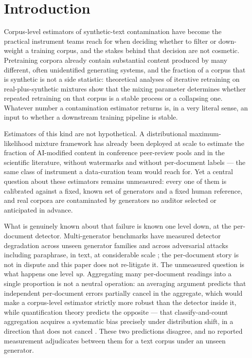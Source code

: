 \documentclass[11pt]{article}
\begin{document}
\section{Introduction}

Corpus-level estimators of synthetic-text contamination have become the practical instrument teams reach for when deciding whether to filter or down-weight a training corpus, and the stakes behind that decision are not cosmetic. Pretraining corpora already contain substantial content produced by many different, often unidentified generating systems, and the fraction of a corpus that is synthetic is not a side statistic: theoretical analyses of iterative retraining on real-plus-synthetic mixtures show that the mixing parameter determines whether repeated retraining on that corpus is a stable process or a collapsing one. Whatever number a contamination estimator returns is, in a very literal sense, an input to whether a downstream training pipeline is stable.

Estimators of this kind are not hypothetical. A distributional maximum-likelihood mixture framework has already been deployed at scale to estimate the fraction of AI-modified content in conference peer-review pools and in the scientific literature, without watermarks and without per-document labels \citep{MonitoringAIContent2024,MappingLLMUse2024} --- the same class of instrument a data-curation team would reach for. Yet a central question about these estimators remains unmeasured: every one of them is calibrated against a fixed, known set of generators and a fixed human reference, and real corpora are contaminated by generators no auditor selected or anticipated in advance.

What is genuinely known about that failure is known one level down, at the per-document detector. Multi-generator benchmarks have measured detector degradation across unseen generator families and across adversarial attacks including paraphrase, in text, at considerable scale \citep{RAID2024Benchmark,MAGE2024InTheWild}; the per-document story is not in dispute and this paper does not re-litigate it. The unmeasured question is what happens one level \emph{up}. Aggregating many per-document readings into a single proportion is not a neutral operation: an averaging argument predicts that independent per-document errors partially cancel in the aggregate, which would make a corpus-level estimator strictly more robust than the detector inside it, while quantification theory predicts the opposite --- that classify-and-count aggregation acquires a systematic bias precisely under distribution shift, in a direction that does not cancel \citep{QuantDatasetShift2023}. These two predictions disagree, and no reported measurement adjudicates between them for a text corpus under an unseen generator.
\end{document}
